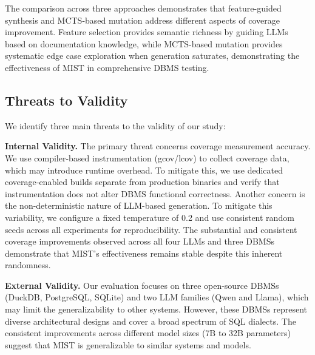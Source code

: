 The comparison across three approaches demonstrates that feature-guided synthesis and MCTS-based mutation address different aspects of coverage improvement. Feature selection provides semantic richness by guiding LLMs based on documentation knowledge, while MCTS-based mutation provides systematic edge case exploration when generation saturates, demonstrating the effectiveness of MIST in comprehensive DBMS testing.

\subsection{Threats to Validity}

We identify three main threats to the validity of our study:

\noindent\textbf{Internal Validity.} The primary threat concerns coverage measurement accuracy. We use compiler-based instrumentation (gcov/lcov) to collect coverage data, which may introduce runtime overhead. To mitigate this, we use dedicated coverage-enabled builds separate from production binaries and verify that instrumentation does not alter DBMS functional correctness. Another concern is the non-deterministic nature of LLM-based generation. To mitigate this variability, we configure a fixed temperature of 0.2 and use consistent random seeds across all experiments for reproducibility. The substantial and consistent coverage improvements observed across all four LLMs and three DBMSs demonstrate that MIST's effectiveness remains stable despite this inherent randomness.


\textbf{External Validity.} Our evaluation focuses on three open-source DBMSs (DuckDB, PostgreSQL, SQLite) and two LLM families (Qwen and Llama), which may limit the generalizability to other systems. However, these DBMSs represent diverse architectural designs and cover a broad spectrum of SQL dialects. The consistent improvements across different model sizes (7B to 32B parameters) suggest that MIST is generalizable to similar systems and models.


